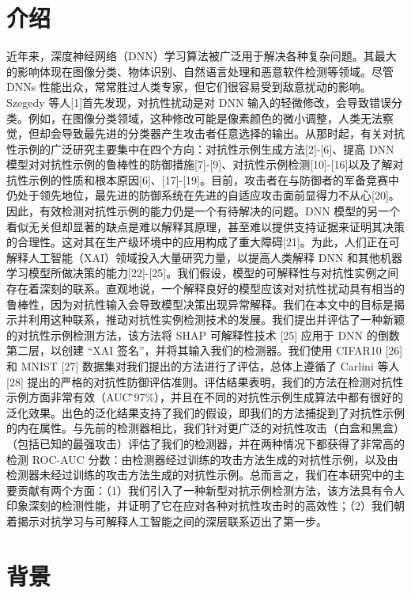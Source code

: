\documentclass[12pt, a4paper]{ctexart} %
\begin{document}
\section{介绍}
近年来，深度神经网络（DNN）学习算法被广泛用于解决各种复杂问题。其最大的影响体现在图像分类、物体识别、自然语言处理和恶意软件检测等领域。尽管 DNNs 性能出众，常常胜过人类专家，但它们很容易受到敌意扰动的影响。Szegedy 等人[1]首先发现，对抗性扰动是对 DNN 输入的轻微修改，会导致错误分类。例如，在图像分类领域，这种修改可能是像素颜色的微小调整，人类无法察觉，但却会导致最先进的分类器产生攻击者任意选择的输出。从那时起，有关对抗性示例的广泛研究主要集中在四个方向：对抗性示例生成方法[2]-[6]、提高 DNN 模型对对抗性示例的鲁棒性的防御措施[7]-[9]、对抗性示例检测[10]-[16]以及了解对抗性示例的性质和根本原因[6]、[17]-[19]。目前，攻击者在与防御者的军备竞赛中仍处于领先地位，最先进的防御系统在先进的自适应攻击面前显得力不从心[20]。因此，有效检测对抗性示例的能力仍是一个有待解决的问题。DNN 模型的另一个看似无关但却显著的缺点是难以解释其原理，甚至难以提供支持证据来证明其决策的合理性。这对其在生产级环境中的应用构成了重大障碍[21]。为此，人们正在可解释人工智能（XAI）领域投入大量研究力量，以提高人类解释 DNN 和其他机器学习模型所做决策的能力[22]-[25]。我们假设，模型的可解释性与对抗性实例之间存在着深刻的联系。直观地说，一个解释良好的模型应该对对抗性扰动具有相当的鲁棒性，因为对抗性输入会导致模型决策出现异常解释。我们在本文中的目标是揭示并利用这种联系，推动对抗性实例检测技术的发展。我们提出并评估了一种新颖的对抗性示例检测方法，该方法将 SHAP 可解释性技术 [25] 应用于 DNN 的倒数第二层，以创建 “XAI 签名”，并将其输入我们的检测器。我们使用 CIFAR10 [26] 和 MNIST [27] 数据集对我们提出的方法进行了评估，总体上遵循了 Carlini 等人 [28] 提出的严格的对抗性防御评估准则。评估结果表明，我们的方法在检测对抗性示例方面非常有效（AUC ̃97\%），并且在不同的对抗性示例生成算法中都有很好的泛化效果。出色的泛化结果支持了我们的假设，即我们的方法捕捉到了对抗性示例的内在属性。与先前的检测器相比，我们针对更广泛的对抗性攻击（白盒和黑盒）（包括已知的最强攻击）评估了我们的检测器，并在两种情况下都获得了非常高的检测 ROC-AUC 分数：由检测器经过训练的攻击方法生成的对抗性示例，以及由检测器未经过训练的攻击方法生成的对抗性示例。总而言之，我们在本研究中的主要贡献有两个方面：（1）我们引入了一种新型对抗示例检测方法，该方法具有令人印象深刻的检测性能，并证明了它在应对各种对抗性攻击时的高效性；（2）我们朝着揭示对抗学习与可解释人工智能之间的深层联系迈出了第一步。

\section{背景}
\end{document}
